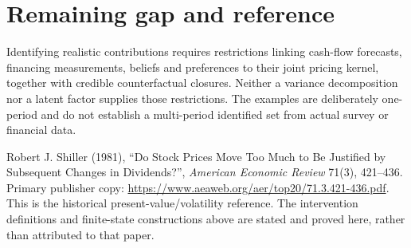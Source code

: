 \documentclass[11pt,a4paper]{article}
\theoremstyle{definition}
\theoremstyle{remark}
\begin{document}
\section{Remaining gap and reference}
Identifying realistic contributions requires restrictions linking cash-flow forecasts, financing measurements, beliefs and preferences to their joint pricing kernel, together with credible counterfactual closures. Neither a variance decomposition nor a latent factor supplies those restrictions. The examples are deliberately one-period and do not establish a multi-period identified set from actual survey or financial data.

Robert J. Shiller (1981), ``Do Stock Prices Move Too Much to Be Justified by Subsequent Changes in Dividends?'', \emph{American Economic Review} 71(3), 421--436. Primary publisher copy: \url{https://www.aeaweb.org/aer/top20/71.3.421-436.pdf}. This is the historical present-value/volatility reference. The intervention definitions and finite-state constructions above are stated and proved here, rather than attributed to that paper.
\end{document}
